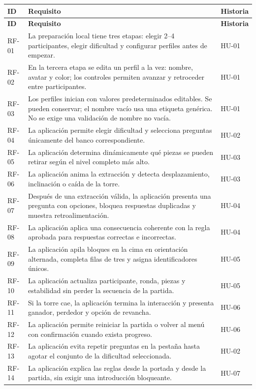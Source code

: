\documentclass[11pt,letterpaper]{article}
\begin{document}
\begin{longtable}{@{}p{.06\linewidth}p{.62\linewidth}p{.12\linewidth}@{}}
\toprule
\textbf{ID} & \textbf{Requisito} & \textbf{Historia} \\
\midrule
\endfirsthead
\toprule
\textbf{ID} & \textbf{Requisito} & \textbf{Historia} \\
\midrule
\endhead
RF-01 & La preparación local tiene tres etapas: elegir 2--4 participantes, elegir dificultad y configurar perfiles antes de empezar. & HU-01 \\
RF-02 & En la tercera etapa se edita un perfil a la vez: nombre, avatar y color; los controles permiten avanzar y retroceder entre participantes. & HU-01 \\
RF-03 & Los perfiles inician con valores predeterminados editables. Se pueden conservar; el nombre vacío usa una etiqueta genérica. No se exige una validación de nombre no vacía. & HU-01 \\
RF-04 & La aplicación permite elegir dificultad y selecciona preguntas únicamente del banco correspondiente. & HU-02 \\
RF-05 & La aplicación determina dinámicamente qué piezas se pueden retirar según el nivel completo más alto. & HU-03 \\
RF-06 & La aplicación anima la extracción y detecta desplazamiento, inclinación o caída de la torre. & HU-03 \\
RF-07 & Después de una extracción válida, la aplicación presenta una pregunta con opciones, bloquea respuestas duplicadas y muestra retroalimentación. & HU-04 \\
RF-08 & La aplicación aplica una consecuencia coherente con la regla aprobada para respuestas correctas e incorrectas. & HU-04 \\
RF-09 & La aplicación apila bloques en la cima en orientación alternada, completa filas de tres y asigna identificadores únicos. & HU-05 \\
RF-10 & La aplicación actualiza participante, ronda, piezas y estabilidad sin perder la secuencia de la partida. & HU-05 \\
RF-11 & Si la torre cae, la aplicación termina la interacción y presenta ganador, perdedor y opción de revancha. & HU-06 \\
RF-12 & La aplicación permite reiniciar la partida o volver al menú con confirmación cuando exista progreso. & HU-06 \\
RF-13 & La aplicación evita repetir preguntas en la pestaña hasta agotar el conjunto de la dificultad seleccionada. & HU-02 \\
RF-14 & La aplicación explica las reglas desde la portada y desde la partida, sin exigir una introducción bloqueante. & HU-07 \\
\bottomrule
\end{longtable}
\end{document}
